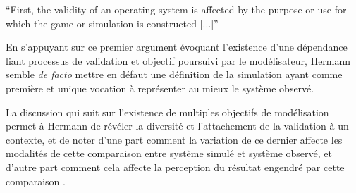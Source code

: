 \foreignquote{english}{First, the validity of an operating system is affected by the purpose or use for which the game or simulation is constructed [...]}\autocite[217]{Hermann1967}




En s'appuyant sur ce premier argument évoquant l'existence d'une dépendance liant processus de validation et objectif poursuivi par le modélisateur, Hermann semble \textit{de facto} mettre en défaut une définition de la simulation ayant comme première et unique vocation à représenter au mieux le système observé.

La discussion qui suit sur l'existence de multiples objectifs de modélisation permet à Hermann de révéler la diversité et l'attachement de la validation à un contexte, et de noter d'une part comment la variation de ce dernier affecte les modalités de cette comparaison entre système simulé et système observé, et d'autre part comment cela affecte la perception du résultat engendré par cette comparaison .

